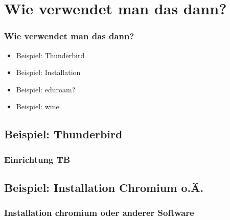 \documentclass{beamer}
\begin{document}
    \section{Wie verwendet man das dann?}
        \begin{frame}
  		\frametitle{Wie verwendet man das dann?}
    		\begin{center}
        		\begin{minipage}{0.44\textwidth}
        		    \begin{itemize}
        		        \item Beispiel: Thunderbird
        		        \item Beispiel: Installation
        		        \item Beispiel: eduroam?
        		        \item Beispiel: wine
        		    \end{itemize}
        		\end{minipage}%
    		\end{center}
    	\end{frame}
    	
        \subsection{Beispiel: Thunderbird}
            \begin{frame}
          		\frametitle{Einrichtung TB}
        		\begin{minipage}{0.44\textwidth}
        		
        		\end{minipage}%
        		\begin{minipage}{0.54\textwidth}
        		
        		\end{minipage}
        	\end{frame}
        	
        \subsection{Beispiel: Installation Chromium o.Ä.}
            \begin{frame}
          		\frametitle{Installation chromium oder anderer Software}
        		\begin{minipage}{0.44\textwidth}
        		
        		\end{minipage}%
        		\begin{minipage}{0.54\textwidth}
        		
        		\end{minipage}
        	\end{frame}
        
\end{document}
